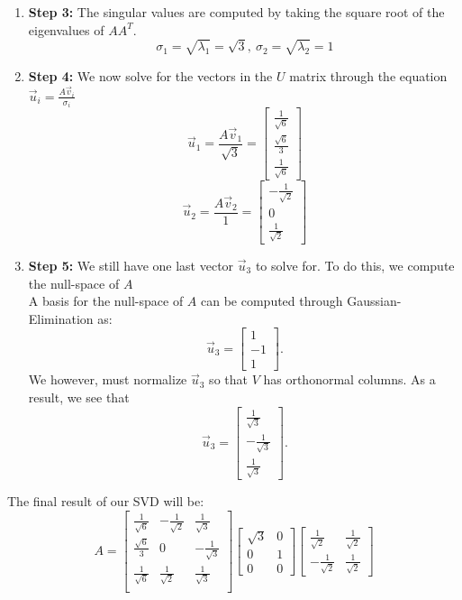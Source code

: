 \begin{enumerate}
{\begin{enumerate}[label=(\roman*)]
        Remember that these vectors form the $V$ matrix.
      \item \textbf{Step 3:}
        The singular values are computed by taking the square root of the eigenvalues of $AA^{T}.$
        $$\sigma_{1} = \sqrt{\lambda_{1}} = \sqrt{3}, \ \sigma_{2} = \sqrt{\lambda_{2}} = 1$$
      \item \textbf{Step 4:}
        We now solve for the vectors in the $U$ matrix through the equation $\vec{u}_i = \frac{A \vec{v}_i}{\sigma_i}$
        $$\vec{u}_{1} = \frac{A \vec{v}_{1}}{\sqrt{3}} = 
        \begin{bmatrix} \frac{1}{\sqrt{6}} \\ \frac{\sqrt{6}}{3} \\ \frac{1}{\sqrt{6}} \end{bmatrix}$$
        $$\vec{u}_{2} = \frac{A \vec{v}_{2}}{1} = 
        \begin{bmatrix} -\frac{1}{\sqrt{2}} \\ 0 \\ \frac{1}{\sqrt{2}} \end{bmatrix}$$
      \item \textbf{Step 5:}
        We still have one last vector $\vec{u}_{3}$ to solve for. To do this, we compute the null-space of $A$ \\
        A basis for the null-space of $A$ can be computed through Gaussian-Elimination as:
        $$\vec{u}_{3} = \begin{bmatrix} 1 \\ -1 \\ 1 \end{bmatrix}.$$
        We however, must normalize $\vec{u}_{3}$ so that $V$ has orthonormal columns. As a result, we see that
        $$\vec{u}_{3} = \begin{bmatrix} \frac{1}{\sqrt{3}} \\ - \frac{1}{\sqrt{3}} \\ \frac{1}{\sqrt{3}} \end{bmatrix}.$$
    \end{enumerate}
    The final result of our SVD will be:
    \begin{equation}
      A = 
      \begin{bmatrix}
      \frac{1}{\sqrt{6}} & -\frac{1}{\sqrt{2}} & \frac{1}{\sqrt{3}} \\
      \frac{\sqrt{6}}{3} & 0 & -\frac{1}{\sqrt{3}} \\
      \frac{1}{\sqrt{6}} & \frac{1}{\sqrt{2}} & \frac{1}{\sqrt{3}} \\ \end{bmatrix}
      \begin{bmatrix} \sqrt{3} & 0 \\ 0 & 1 \\ 0 & 0 \end{bmatrix}
      \begin{bmatrix}
      \frac{1}{\sqrt{2}} & \frac{1}{\sqrt{2}} \\
      -\frac{1}{\sqrt{2}} & \frac{1}{\sqrt{2}} \end{bmatrix} 
    \end{equation}

}
\end{enumerate}
